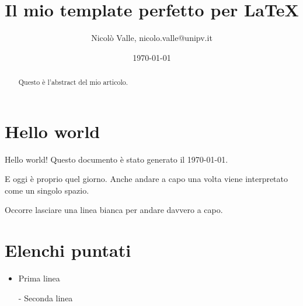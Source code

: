 \documentclass[a4paper, 12pt]{article} %
\title{Il mio template perfetto per \LaTeX} %
\date{\today} %
\author{Nicolò Valle, nicolo.valle@unipv.it}
\begin{document}
 

\maketitle  %

\begin{abstract}
  Questo è l'abstract del mio articolo.
  \lipsum[1] %
\end{abstract}


\tableofcontents %



\section{Hello world}

Hello world! Questo                  documento è stato generato il \today.


E oggi è proprio quel giorno.
Anche andare a capo una volta viene interpretato come un singolo spazio.

Occorre lasciare una linea bianca per andare davvero a capo.





\section{Elenchi puntati}

\begin{itemize} %
\item Prima linea
\item[-] Seconda linea %
\end{itemize}
\end{document}
